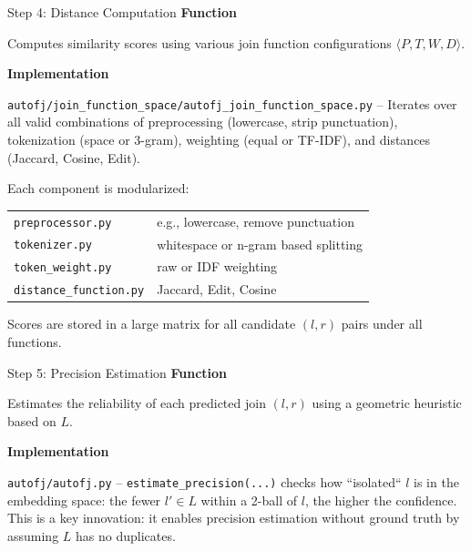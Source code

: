 \documentclass[8pt]{beamer} %
\begin{document}
\begin{frame}{Step 4: Distance Computation}
	\textbf{Function}
	
	Computes similarity scores using various join function configurations $\langle P, T, W, D \rangle$.
	
	\vspace{2em}
	
	\textbf{Implementation}
	
	
	\texttt{autofj/join\_function\_space/autofj\_join\_function\_space.py} – Iterates over all valid combinations of preprocessing (lowercase, strip punctuation), tokenization (space or 3-gram), weighting (equal or TF-IDF), and distances (Jaccard, Cosine, Edit). \\

	\vspace{0.5em}
	
	Each component is modularized:

	\vspace{0.5em}
	
	\begin{tabular}{l p{2.5in}}
		\texttt{preprocessor.py} & e.g., lowercase, remove punctuation \\
		\texttt{tokenizer.py} & whitespace or n-gram based splitting\\
		\texttt{token\_weight.py} & raw or IDF weighting\\
		\texttt{distance\_function.py}& Jaccard, Edit, Cosine
	\end{tabular}

	\vspace{0.5em}

	Scores are stored in a large matrix for all candidate $(l, r)$ pairs under all functions.
\end{frame}

\begin{frame}{Step 5: Precision Estimation}
	\textbf{Function}
	
	Estimates the reliability of each predicted join $(l, r)$ using a geometric heuristic based on $L$.
	
	\vspace{2em}
	
	\textbf{Implementation}
	
	\texttt{autofj/autofj.py} – \texttt{estimate\_precision(...)} checks how ``isolated`` $l$ is in the embedding space: the fewer $l' \in L$ within a 2-ball of $l$, the higher the confidence. \\
	This is a key innovation: it enables precision estimation without ground truth by assuming $L$ has no duplicates.
\end{frame}
\end{document}
